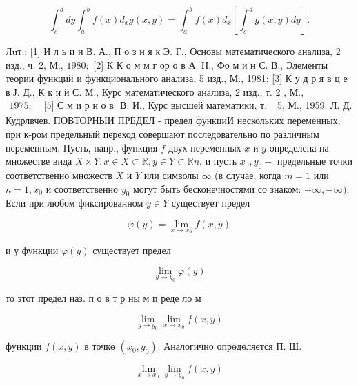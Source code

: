 \documentclass[10pt]{article}
\begin{document}
\[

\int_{c}^{d} d y \int_{a}^{b} f(x) d_{x} g(x, y)=\int_{a}^{b} f(x) d_{x}\left[\int_{c}^{d} g(x, y) d y\right] .

\]



Лuт.: [1] И л ь и н В. А., П о з н я к Э. Г., Основы математического анализа, 2 изд., ч. 2, М., $1980 ;$ [2] К К о м м г ор о в А. Н., Фо м и н С. В., Элементы теории функций и функционального анализа, 5 изд., М., 1981; [3] К у д р я в ц е в Ј. Д., К к и й С. М., Курс математического анализа, 2 изд., т. 2 , М., $\begin{array}{ll}1975 ; & \text { [5] С м и р н о в } \text { В. И., Курс высшей математики, т. }\end{array}$ 5, М., 1959. Л. Д. Кудрлвчев. ПОВТОРНЫИ ПРЕДЕЛ - предел функциИ нескольких переменных, при к-ром предельный переход совершают последовательно по различным переменным. Пусть, напр., функция $f$ двух переменных $x$ и $y$ определена на множестве вида $X \times Y, x \in X \subset \mathbb{R}, y \in Y \subset \mathbb{R} n$, и пусть $x_{0}, y_{0}-$ предельные точки соответственно множеств $X$ и $Y$ или символы $\infty$ (в случае, когда $m=1$ или $n=1, x_{0}$ и соответственно $y_{0}$ могут быть бесконечностями со знаком: $+\infty,-\infty)$. Если при любом фиксированном $y \in Y$ существует предел



\[

\varphi(y)=\lim _{x \rightarrow x_{0}} f(x, y)

\]



и у функции $\varphi(y)$ существует предел



\[

\lim _{y \rightarrow y_{0}} \varphi(y)

\]



то этот предел наз. п о в т р ны м п реде ло м



\[

\lim _{y \rightarrow y_{0}} \lim _{x \rightarrow x_{0}} f(x, y)

\]



функции $f(x, y)$ в точкө $\left(x_{0}, y_{0}\right)$. Аналогично опрөдөляется П. Ш.



\[

\lim _{x \rightarrow x_{0}} \lim _{y \rightarrow y_{0}} f(x, y)

\]
\end{document}
